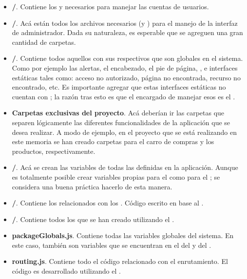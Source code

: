 \begin{itemize}
	\item
		\textbf{\folderAccount/}. Contiene los \templatesMETEOR y \helpersMETEOR necesarios para manejar las cuentas de usuarios. 
	\item
		\textbf{\folderDashboard/}. Acá están todos los archivos necesarios (\templatesMETEOR y \helpersMETEOR) para el manejo de la interfaz de administrador. Dada su naturaleza, es esperable que se agreguen una gran cantidad de carpetas.
	\item
		\textbf{\folderLayout/}. Contiene todos aquellos \templatesMETEOR con sus respectivos \helpersMETEOR que son globales en el sistema. Como por ejemplo las alertas, el encabezado, el pie de página, \loadingCPT, e interfaces estáticas tales como: acceso no autorizado, página no encontrada, recurso no encontrado, etc. Es importante agregar que estas interfaces estáticas no cuentan con \helpersMETEOR; la razón tras esto es que el encargado de manejar esos \templatesMETEOR es el \packagesAS \nameRouter.
	\item
		\textbf{Carpetas exclusivas del proyecto}. Acá deberían ir las carpetas que separen lógicamente las diferentes funcionalidades de la aplicación que se desea realizar. A modo de ejemplo, en el proyecto que se está realizando en este memoria se han creado carpetas para el carro de compras y los productos, respectivamente.
\end{itemize}



\begin{itemize}
	\item
		\textbf{\folderCollections/}. Acá se crean las variables de todas las \collectionsMETEOR definidas en la aplicación. Aunque es totalmente posible crear variables propias para el \clientAS como para el \serverAS; se considera una buena práctica hacerlo de esta manera.
	\item
	 	\textbf{\folderHooks/}. Contiene los \hooksCPT relacionados con los \collectionsMETEOR. Código escrito en base al \packagesAS \nameCollectionHooks.
	\item
		\textbf{\folderSchemas/}. Contiene todos los \schemasDB que se han creado utilizando el \packagesAS \nameCollectionTwo.
	\item
		\textbf{packageGlobals.js}. Contiene todas las variables globales del sistema. En este caso, también son variables que se encuentran en el \environmentPL del \clientAS y del \serverAS.
	\item
		\textbf{routing.js}. Contiene todo el código relacionado con el enrutamiento. El código es desarrollado utilizando el \packagesAS \nameRouter.
\end{itemize}

